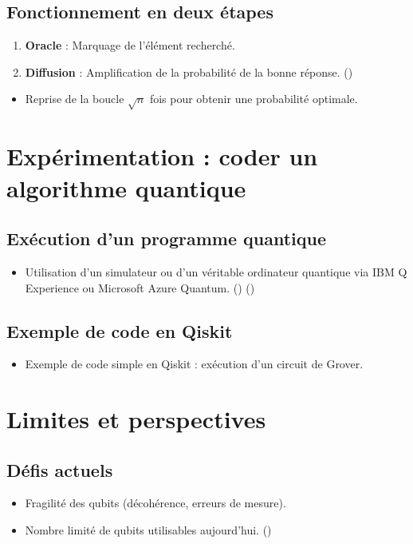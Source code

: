 \documentclass{article}
\begin{document}
\subsection{Fonctionnement en deux étapes}
\begin{enumerate}
    \item \textbf{Oracle} : Marquage de l'élément recherché.
    \item \textbf{Diffusion} : Amplification de la probabilité de la bonne réponse. (\cite{V2F_2024})
\end{enumerate}
\begin{itemize}
    \item Reprise de la boucle \(\sqrt{n}\) fois pour obtenir une probabilité optimale.
\end{itemize}

\section{Expérimentation : coder un algorithme quantique}
\subsection{Exécution d'un programme quantique}
\begin{itemize}
    \item Utilisation d’un simulateur ou d’un véritable ordinateur quantique via IBM Q Experience ou Microsoft Azure Quantum. (\cite{microsoftAzureQuantum}) (\cite{mediumGettingStarted})
\end{itemize}
\subsection{Exemple de code en Qiskit}
\begin{itemize}
    \item Exemple de code simple en Qiskit : exécution d'un circuit de Grover.
\end{itemize}

\section{Limites et perspectives}
\subsection{Défis actuels}
\begin{itemize}
    \item Fragilité des qubits (décohérence, erreurs de mesure).
    \item Nombre limité de qubits utilisables aujourd'hui. (\cite{V2F_2024})
\end{itemize}
\end{document}
